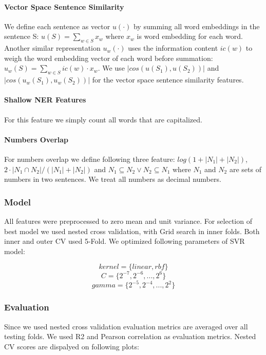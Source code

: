 \documentclass[10pt, a4paper]{article}
\begin{document}
\paragraph{Vector Space Sentence Similarity \\}
We define each sentence as vector $u(\cdot)$ by summing all word embeddings in the sentence S: $ u(S) = \sum_{w \in S} x_w$ where $x_w$ is word embedding for each word. Another similar
representation $u_w(\cdot)$ uses the information content
$ic(w)$ to weigh the word embedding vector of each word
before summation: $u_w(S) = \sum_{w \in S} ic(w) \cdot x_w.$
We use $|cos(u(S_1), u(S_2))|$ and $|cos(u_w(S_1), u_w(S_2))|$ for the vector space sentence similarity features. \citep{Saric2012TakeLabSF}
\paragraph{Shallow NER Features \\}
For this feature we simply count all words that are capitalized.
\paragraph{Numbers Overlap \\}
For numbers overlap we define following three feature: $log(1+|N_1|+|N_2|)$, $2\cdot|N_1 \cap N_2|/(|N_1|+|N_2|)$ and $N_1 \subseteq N_2 \vee N_2 \subseteq N_1$
where $N_1$ and $N_2$ are sets of numbers in two sentences. We treat all numbers as decimal numbers.

\subsubsection{Model}
All features were preprocessed to zero mean and unit variance. For selection of best model we used nested cross validation, with Grid search in inner folds. Both inner and outer CV used 5-Fold. We optimized following parameters of SVR model:

\[ kernel = \{ linear, rbf \} \]
\[ C = \{ 2^{-7},2^{-6}, ..., 2^6 \} \]
\[ gamma = \{ 2^{-5}, 2^{-4},..., 2^2 \} \]

\subsubsection{Evaluation}
Since we used nested cross validation evaluation metrics are averaged over all testing folds. We used R2 and Pearson correlation as evaluation metrics. Nested CV scores are dispalyed on following plots:
\end{document}

